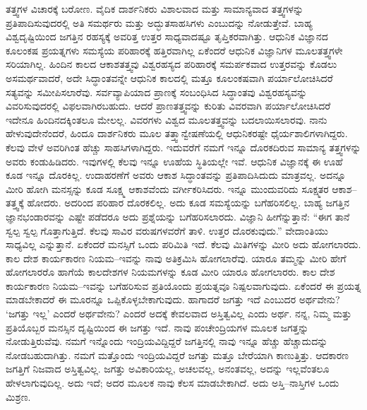 ತತ್ತ್ವಗಳ ವಿಚಾರಕ್ಕೆ ಬರೋಣ. ವೈದಿಕ ದಾರ್ಶನಿಕರು ವಿಶಾಲವಾದ ಮತ್ತು ಸಾಮಾನ್ಯವಾದ ತತ್ತ್ವಗಳನ್ನು ಪ್ರತಿಪಾದಿಸುವುದರಲ್ಲಿ ಅತಿ ಸಮರ್ಥರು ಮತ್ತು ಅದ್ಭುತ\break ಸಾಹಸಿಗಳು ಎಂಬುದನ್ನು ನೋಡುತ್ತೇವೆ. ಬಾಹ್ಯ ವಿಶ್ವದೃಷ್ಟಿಯಿಂದ ಜಗತ್ತಿನ ರಹಸ್ಯಕ್ಕೆ ಅವರಿತ್ತ ಉತ್ತರ ಸಾಧ್ಯವಾದಷ್ಟೂ ತೃಪ್ತಿಕರವಾಗಿತ್ತು. ಆಧುನಿಕ ವಿಜ್ಞಾನದ ಕೂಲಂಕಷ ಪ್ರಯತ್ನಗಳು ಸಮಸ್ಯೆಯ ಪರಿಹಾರಕ್ಕೆ ಹತ್ತಿರವಾಗಿಲ್ಲ ಏಕೆಂದರೆ ಆಧುನಿಕ ವಿಜ್ಞಾನಿಗಳ ಮೂಲತತ್ತ್ವಗಳೇ ಸರಿಯಾಗಿಲ್ಲ. ಹಿಂದಿನ ಕಾಲದ ಆಕಾಶತತ್ತ್ವವು ವಿಶ್ವರಹಸ್ಯದ ಪರಿಹಾರಕ್ಕೆ ಸಮರ್ಪಕವಾದ ಉತ್ತರವನ್ನು ಕೊಡಲು ಅಸಮರ್ಥವಾದರೆ, ಅದೇ ಸಿದ್ಧಾಂತವನ್ನೇ ಆಧುನಿಕ ಕಾಲದಲ್ಲಿ ಮತ್ತೂ ಕೂಲಂಕಷವಾಗಿ ಪರ್ಯಾಲೋಚಿಸಿದರೆ ಸತ್ಯವನ್ನು ಸಮೀಪಿಸಲಾರೆವು. ಸರ್ವವ್ಯಾಪಿಯಾದ ಪ್ರಾಣಕ್ಕೆ ಸಂಬಂಧಿಸಿದ ಸಿದ್ಧಾಂತವು ವಿಶ್ವರಹಸ್ಯವನ್ನು ವಿವರಿಸುವುದರಲ್ಲಿ ವಿಫಲವಾಗಿರಬಹುದು. ಆದರೆ ಪ್ರಾಣತತ್ತ್ವವನ್ನು ಕುರಿತು ವಿವರವಾಗಿ ಪರ್ಯಾಲೋಚಿಸಿದರೆ ಇದೇನೂ ಹಿಂದಿನದಕ್ಕಿಂತಲೂ ಮೇಲಲ್ಲ. ವಿವರಗಳು ವಿಶ್ವದ ಮೂಲತತ್ತ್ವವನ್ನು ಬದಲಾಯಿಸಲಾರವು. ನಾನು ಹೇಳುವುದೇನೆಂದರೆ, ಹಿಂದೂ ದಾರ್ಶನಿಕರು ಮೂಲ ತತ್ತ್ವಾನ್ವೇಷಣೆಯಲ್ಲಿ ಆಧುನಿಕರಷ್ಟೇ ಧೈರ್ಯಶಾಲಿಗಳಾಗಿದ್ದರು. ಕೆಲವು ವೇಳೆ ಅವರಿಗಿಂತ ಹೆಚ್ಚು ಸಾಹಸಿಗಳಾಗಿದ್ದರು. ಇದುವರೆಗೆ ನಮಗೆ ಇನ್ನೂ ದೊರಕದಿರುವ ಸಾಮಾನ್ಯ ತತ್ತ್ವಗಳನ್ನು ಅವರು ಕಂಡುಹಿಡಿದರು. ಇವುಗಳಲ್ಲಿ ಕೆಲವು ಇನ್ನೂ ಊಹೆಯ ಸ್ಥಿತಿಯಲ್ಲೇ ಇವೆ. ಆಧುನಿಕ ವಿಜ್ಞಾನಕ್ಕೆ ಈ ಊಹೆ ಕೂಡ ಇನ್ನೂ ದೊರಕಿಲ್ಲ. ಉದಾಹರಣೆಗೆ ಅವರು ಆಕಾಶ ಸಿದ್ಧಾಂತವನ್ನು ಪ್ರತಿಪಾದಿಸಿದುದು ಮಾತ್ರವಲ್ಲ. ಅದನ್ನೂ ಮೀರಿ ಹೋಗಿ ಮನಸ್ಸನ್ನು ಕೂಡ ಸೂಕ್ಷ್ಮ ಆಕಾಶವೆಂದು ವರ್ಗೀಕರಿಸಿದರು. ಇನ್ನೂ ಮುಂದುವರಿದು ಸೂಕ್ಷ್ಮತರ ಆಕಾಶ–ತತ್ತ್ವಕ್ಕೆ ಹೋದರು. ಅದರಿಂದ ಪರಿಹಾರ ದೊರಕಲಿಲ್ಲ. ಅದು ಕೂಡ ಸಮಸ್ಯೆಯನ್ನು ಬಗೆಹರಿಸಲಿಲ್ಲ. ಬಾಹ್ಯ ಜಗತ್ತಿನ ಜ್ಞಾನಭಂಡಾರವನ್ನು ಎಷ್ಟೇ ಪಡೆದರೂ ಅದು ಪ್ರಶ್ನೆಯನ್ನು ಬಗೆಹರಿಸಲಾರದು. ವಿಜ್ಞಾನಿ ಹೀಗೆನ್ನುತ್ತಾನೆ: “ಈಗ ತಾನೆ ಸ್ವಲ್ಪ ಸ್ವಲ್ಪ ಗೊತ್ತಾಗುತ್ತಿದೆ. ಕೆಲವು ಸಾವಿರ ವರುಷಗಳವರೆಗೆ ತಾಳಿ. ಉತ್ತರ ದೊರಕುವುದು.” ವೇದಾಂತಿಯು ಸಾಧ್ಯವಿಲ್ಲ ಎನ್ನುತ್ತಾನೆ. ಏಕೆಂದರೆ ಮನಸ್ಸಿಗೆ ಒಂದು ಪರಿಮಿತಿ ಇದೆ. ಕೆಲವು ಮಿತಿಗಳನ್ನು ಮೀರಿ ಅದು ಹೋಗಲಾರದು. ಕಾಲ ದೇಶ ಕಾರ್ಯಕಾರಣ ನಿಯಮ–ಇವನ್ನು ನಾವು ಅತಿಕ್ರಮಿಸಿ ಹೋಗಲಾರೆವು. ಯಾರೂ ತಮ್ಮನ್ನು ಮೀರಿ ಹೇಗೆ ಹೋಗಲಾರರೊ ಹಾಗೆಯೆ ಕಾಲದೇಶಗಳ ನಿಯಮಗಳನ್ನು ಕೂಡ ಮೀರಿ ಯಾರೂ ಹೋಗಲಾರರು. ಕಾಲ ದೇಶ ಕಾರ್ಯಕಾರಣ ನಿಯಮ–ಇವನ್ನು ಬಗೆಹರಿಸುವ ಪ್ರತಿಯೊಂದು ಪ್ರಯತ್ನವೂ ನಿಷ್ಪಲವಾಗುವುದು. ಏಕೆಂದರೆ ಈ ಪ್ರಯತ್ನ ಮಾಡಬೇಕಾದರೆ ಈ ಮೂರನ್ನೂ ಒಪ್ಪಿಕೊಳ್ಳಬೇಕಾಗುವುದು. ಹಾಗಾದರೆ ಜಗತ್ತು ಇದೆ ಎಂಬುದರ ಅರ್ಥವೇನು? ‘ಜಗತ್ತು ಇಲ್ಲ’ ಎಂದರೆ ಅರ್ಥವೇನು? ಎಂದರೆ ಅದಕ್ಕೆ ಕೇವಲವಾದ ಅಸ್ತಿತ್ವವಿಲ್ಲ ಎಂದು ಅರ್ಥ. ನನ್ನ, ನಿಮ್ಮ ಮತ್ತು ಪ್ರತಿಯೊಬ್ಬರ ಮನಸ್ಸಿನ ದೃಷ್ಟಿಯಿಂದ ಈ ಜಗತ್ತು ಇದೆ. ನಾವು ಪಂಚೇಂದ್ರಿಯಗಳ ಮೂಲಕ ಜಗತ್ತನ್ನು ನೋಡುತ್ತಿರುವೆವು. ನಮಗೆ ಇನ್ನೊಂದು ಇಂದ್ರಿಯವಿದ್ದಿದ್ದರೆ ಜಗತ್ತಿನಲ್ಲಿ ನಾವು ಇನ್ನೂ ಹೆಚ್ಚು ಹೆಚ್ಚಾದುದನ್ನು ನೋಡಬಹುದಾಗಿತ್ತು. ನಮಗೆ ಮತ್ತೊಂದು ಇಂದ್ರಿಯವಿದ್ದರೆ ಜಗತ್ತು ಮತ್ತೂ ಬೇರೆಯಾಗಿ ಕಾಣುತ್ತಿತ್ತು. ಆದಕಾರಣ ಜಗತ್ತಿಗೆ ನಿಜವಾದ ಅಸ್ತಿತ್ವವಿಲ್ಲ. ಜಗತ್ತು ಅವಿಕಾರಿಯಲ್ಲ, ಅಚಲವಲ್ಲ, ಅನಂತವಲ್ಲ, ಅದನ್ನು ಇಲ್ಲವೆಂತಲೂ ಹೇಳಲಾಗುವುದಿಲ್ಲ. ಅದು ಇದೆ; ಅದರ ಮೂಲಕ ನಾವು ಕೆಲಸ ಮಾಡಬೇಕಾಗಿದೆ. ಅದು ಅಸ್ತಿ–ನಾಸ್ತಿಗಳ ಒಂದು ಮಿಶ್ರಣ.

